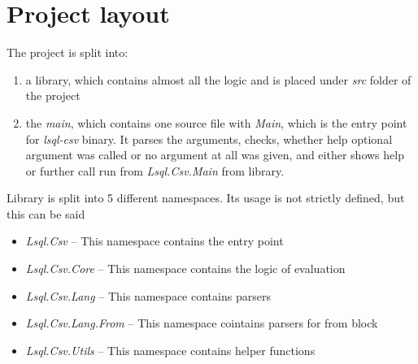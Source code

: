 \section{Project layout}

The project is split into:
\begin{enumerate}
  \item a library, which contains almost all the logic and is placed under
       \textit{src} folder of the project

  \item the \textit{main}, which contains one source file
      with \textit{Main}, which is the entry point for \textit{lsql-csv} binary. 
      It parses the arguments, checks, whether help optional argument was called or no argument at all was given, 
      and either shows help or further call run from \textit{Lsql.Csv.Main} from library.
\end{enumerate}

Library is split into 5 different namespaces. Its usage is not strictly defined, but this can be said
\begin{itemize}
    \item \textit{Lsql.Csv} -- This namespace contains the entry point
    \item \textit{Lsql.Csv.Core} -- This namespace contains the logic of evaluation
    \item \textit{Lsql.Csv.Lang} -- This namespace contains parsers
    \item \textit{Lsql.Csv.Lang.From} -- This namespace cointains parsers for from block
    \item \textit{Lsql.Csv.Utils} -- This namespace contains helper functions
\end{itemize}

